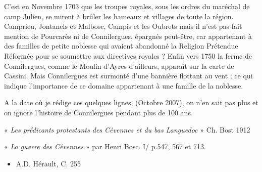 \vspace{0.2cm}

C’est en Novembre 1703 que les troupes royales, sous les ordres du maréchal de camp Julien,
se mirent à brûler les hameaux et villages de toute la région. Camprieu, Jontanels et Malbosc,
Campis et les Oubrets mais il n’est pas fait mention de Pourcarès ni de Connilergues,
épargnés peut-être, car appartenant à des familles de petite noblesse qui avaient abandonné la
Religion Prétendue Réformée pour se soumettre aux directives royales ?
Enfin vers 1750 la ferme de Connilergues, comme le Moulin d’Ayres d’ailleurs, apparaît sur
la carte de Cassini. Mais Connilergues est surmonté d’une bannière flottant au vent ; ce qui
indique l’importance de ce domaine appartenant à une famille de la noblesse.

\vspace{0.2cm}

A la date où je rédige ces quelques lignes, (Octobre 2007), on n’en sait pas plus et on ignore
l’histoire de Connilergues pendant plus de 100 ans.

\vspace{0.2cm}

« \textit{Les prédicants protestants des Cévennes et du bas Languedoc} » Ch. Bost 1912

« \textit{La guerre des Cévennes} » par Henri Bosc. I/ p.547, 567 et 713.

\begin{itemize}
    \item A.D. Hérault, C. 255
\end{itemize}
